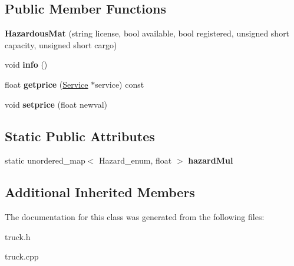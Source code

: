 \subsection*{Public Member Functions}
\begin{DoxyCompactItemize}
\item 
\mbox{\label{class_hazardous_mat_adff1b06ba4631c6b3f77168e4b792b1f}} 
{\bfseries Hazardous\+Mat} (string license, bool available, bool registered, unsigned short capacity, unsigned short cargo)
\item 
\mbox{\label{class_hazardous_mat_ab07463da3e9a5d3b8933d2b01332ed00}} 
void {\bfseries info} ()
\item 
\mbox{\label{class_hazardous_mat_a73278c12e87de90d34a59be50129c714}} 
float {\bfseries getprice} (\hyperlink{class_service}{Service} $\ast$service) const
\item 
\mbox{\label{class_hazardous_mat_ad4b608a3cf000d1c13f01d8d34f1d6fc}} 
void {\bfseries setprice} (float newval)
\end{DoxyCompactItemize}
\subsection*{Static Public Attributes}
\begin{DoxyCompactItemize}
\item 
\mbox{\label{class_hazardous_mat_a0d695364bed729ddeca5851314281ad2}} 
static unordered\+\_\+map$<$ Hazard\+\_\+enum, float $>$ {\bfseries hazard\+Mul}
\end{DoxyCompactItemize}
\subsection*{Additional Inherited Members}


The documentation for this class was generated from the following files\+:\begin{DoxyCompactItemize}
\item 
truck.\+h\item 
truck.\+cpp\end{DoxyCompactItemize}
